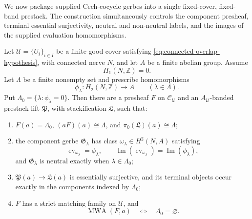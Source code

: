 We now package supplied Cech-cocycle gerbes into a single fixed-cover,
fixed-band prestack.  The construction simultaneously controls the
component presheaf, terminal essential surjectivity, neutral and non-neutral
labels, and the images of the supplied evaluation homomorphisms.

\begin{theorem}
\label{thm:prescribed-component-image-construction}
Let \(\mathcal U=\{U_i\}_{i\in I}\) be a finite good cover satisfying
\eqref{eq:connected-overlap-hypothesis}, with connected nerve \(N\), and let
\(A\) be a finite abelian group.  Assume
\[
 H_1(N,\mathbb Z)=0.
\]
Let \(\Lambda\) be a finite nonempty set and prescribe homomorphisms
\[
 \phi_\lambda:H_2(N,\mathbb Z)\longrightarrow A
 \qquad(\lambda\in\Lambda).
\]
Put \(\Lambda_0=\{\lambda:\phi_\lambda=0\}\).  Then there are a presheaf
\(F\) on \(\mathcal C_{\mathcal U}\) and an
\(A_{\mathcal U}\)-banded prestack lift
\(\mathfrak P\), with stackification \(\mathfrak L\), such that:
\begin{enumerate}[label=(\roman*),nosep]
\item \(F(a)=\Lambda_0\), \((aF)(a)\cong\Lambda\), and
      \(\pi_0(\mathfrak L)(a)\cong\Lambda\);
\item the component gerbe \(\mathfrak G_\lambda\) has class
      \(\omega_\lambda\in H^2(N,A)\) satisfying
      \[
      \operatorname{ev}_{\omega_\lambda}=\phi_\lambda,
      \qquad
      \operatorname{Im}(\operatorname{ev}_{\omega_\lambda})
      =\operatorname{Im}(\phi_\lambda),
      \]
      and \(\mathfrak G_\lambda\) is neutral exactly when
      \(\lambda\in\Lambda_0\);
\item \(\mathfrak P(a)\to\mathfrak L(a)\) is essentially surjective, and
      its terminal objects occur exactly in the components indexed by
      \(\Lambda_0\);
\item \(F\) has a strict matching family on \(\mathcal U\), and
      \[
      \operatorname{MWA}(F,a)
      \quad\Longleftrightarrow\quad
      \Lambda_0=\varnothing.
      \]
\end{enumerate}
\end{theorem}

